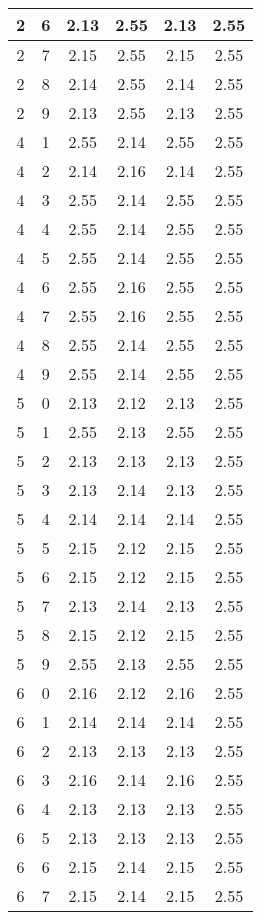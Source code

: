 \begin{longtable}{|c|c||c||c||c|c|}
	2 & 6 & 2.13 & 2.55 & 2.13 & 2.55 \\ \hline
	2 & 7 & 2.15 & 2.55 & 2.15 & 2.55 \\ \hline
	2 & 8 & 2.14 & 2.55 & 2.14 & 2.55 \\ \hline
	2 & 9 & 2.13 & 2.55 & 2.13 & 2.55 \\ \hline
	4 & 1 & 2.55 & 2.14 & 2.55 & 2.55 \\ \hline
	4 & 2 & 2.14 & 2.16 & 2.14 & 2.55 \\ \hline
	4 & 3 & 2.55 & 2.14 & 2.55 & 2.55 \\ \hline
	4 & 4 & 2.55 & 2.14 & 2.55 & 2.55 \\ \hline
	4 & 5 & 2.55 & 2.14 & 2.55 & 2.55 \\ \hline
	4 & 6 & 2.55 & 2.16 & 2.55 & 2.55 \\ \hline
	4 & 7 & 2.55 & 2.16 & 2.55 & 2.55 \\ \hline
	4 & 8 & 2.55 & 2.14 & 2.55 & 2.55 \\ \hline
	4 & 9 & 2.55 & 2.14 & 2.55 & 2.55 \\ \hline
	5 & 0 & 2.13 & 2.12 & 2.13 & 2.55 \\ \hline
	5 & 1 & 2.55 & 2.13 & 2.55 & 2.55 \\ \hline
	5 & 2 & 2.13 & 2.13 & 2.13 & 2.55 \\ \hline
	5 & 3 & 2.13 & 2.14 & 2.13 & 2.55 \\ \hline
	5 & 4 & 2.14 & 2.14 & 2.14 & 2.55 \\ \hline
	5 & 5 & 2.15 & 2.12 & 2.15 & 2.55 \\ \hline
	5 & 6 & 2.15 & 2.12 & 2.15 & 2.55 \\ \hline
	5 & 7 & 2.13 & 2.14 & 2.13 & 2.55 \\ \hline
	5 & 8 & 2.15 & 2.12 & 2.15 & 2.55 \\ \hline
	5 & 9 & 2.55 & 2.13 & 2.55 & 2.55 \\ \hline
	6 & 0 & 2.16 & 2.12 & 2.16 & 2.55 \\ \hline
	6 & 1 & 2.14 & 2.14 & 2.14 & 2.55 \\ \hline
	6 & 2 & 2.13 & 2.13 & 2.13 & 2.55 \\ \hline
	6 & 3 & 2.16 & 2.14 & 2.16 & 2.55 \\ \hline
	6 & 4 & 2.13 & 2.13 & 2.13 & 2.55 \\ \hline
	6 & 5 & 2.13 & 2.13 & 2.13 & 2.55 \\ \hline
	6 & 6 & 2.15 & 2.14 & 2.15 & 2.55 \\ \hline
	6 & 7 & 2.15 & 2.14 & 2.15 & 2.55 \\ \hline

\end{longtable}
